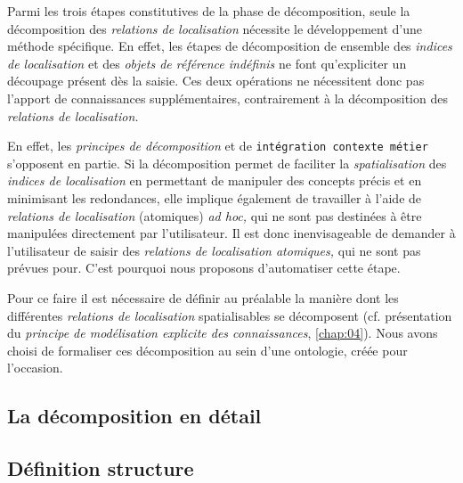 Parmi les trois étapes constitutives de la phase de décomposition,
seule la décomposition des \emph{relations de localisation} nécessite
le développement d'une méthode spécifique. En effet, les étapes de
décomposition de ensemble des \emph{indices de localisation} et des
\emph{objets de référence indéfinis} ne font qu'expliciter un
découpage présent dès la saisie. Ces deux opérations ne nécessitent
donc pas l'apport de connaissances supplémentaires, contrairement à la
décomposition des \emph{relations de localisation.}

En effet, les \emph{principes de décomposition} et de
\texttt{intégration contexte métier} s'opposent en partie. Si la
décomposition permet de faciliter la \emph{spatialisation} des
\emph{indices de localisation} en permettant de manipuler des concepts
précis et en minimisant les redondances, elle implique également de
travailler à l'aide de \emph{relations de localisation} (atomiques)
\emph{ad hoc,} qui ne sont pas destinées à être manipulées directement
par l'utilisateur. Il est donc inenvisageable de demander à
l'utilisateur de saisir des \emph{relations de localisation
  atomiques,} qui ne sont pas prévues pour. C'est pourquoi nous
proposons d'automatiser cette étape.

Pour ce faire il est nécessaire de définir au préalable la manière
dont les différentes \emph{relations de localisation} spatialisables
se décomposent (cf. présentation du \emph{principe de modélisation
  explicite des connaissances}, \autoref{chap:04}). Nous avons choisi
de formaliser ces décomposition au sein d'une ontologie, créée pour
l'occasion.

\subsection{La décomposition en détail}

\subsection{Définition structure}


